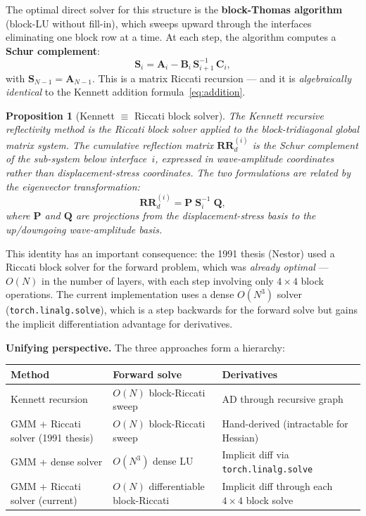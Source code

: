 \documentclass[11pt,a4paper]{article}
\newcommand{\RR}{\mathbf{RR}}
\theoremstyle{plain}
\newtheorem{proposition}{Proposition}
\theoremstyle{remark}
\begin{document}
The optimal direct solver for this structure is the \textbf{block-Thomas
algorithm} (block-LU without fill-in), which sweeps upward through the
interfaces eliminating one block row at a time.  At each step, the
algorithm computes a \textbf{Schur complement}:
\begin{equation}\label{eq:schur}
  \mathbf{S}_i
  = \mathbf{A}_i - \mathbf{B}_i\,\mathbf{S}_{i+1}^{-1}\,\mathbf{C}_i,
\end{equation}
with $\mathbf{S}_{N-1} = \mathbf{A}_{N-1}$.  This is a matrix Riccati
recursion --- and it is \emph{algebraically identical} to the Kennett
addition formula~\eqref{eq:addition}.

\begin{proposition}[Kennett $\equiv$ Riccati block solver]
The Kennett recursive reflectivity method is the Riccati block solver
applied to the block-tridiagonal global matrix system.  The cumulative
reflection matrix $\RR_d^{(i)}$ is the Schur complement of the
sub-system below interface~$i$, expressed in wave-amplitude coordinates
rather than displacement-stress coordinates.  The two formulations are
related by the eigenvector transformation:
\begin{equation}\label{eq:kennett-riccati}
  \RR_d^{(i)}
  = \mathbf{P}\;\mathbf{S}_i^{-1}\;\mathbf{Q},
\end{equation}
where $\mathbf{P}$ and $\mathbf{Q}$ are projections from the
displacement-stress basis to the up/downgoing wave-amplitude basis.
\end{proposition}

This identity has an important consequence: the 1991 thesis (Nestor)
used a Riccati block solver for the forward problem, which was
\emph{already optimal} --- $O(N)$ in the number of layers, with each
step involving only $4\times 4$ block operations.  The current
implementation uses a dense $O(N^3)$ solver
(\texttt{torch.linalg.solve}), which is a step backwards for the forward
solve but gains the implicit differentiation advantage for derivatives.

\medskip\noindent
\textbf{Unifying perspective.}  The three approaches form a hierarchy:

\begin{center}
\renewcommand{\arraystretch}{1.3}
\begin{tabular}{lp{4.2cm}p{4.2cm}}
  \toprule
  \textbf{Method}
    & \textbf{Forward solve}
    & \textbf{Derivatives} \\
  \midrule
  Kennett recursion
    & $O(N)$ block-Riccati sweep
    & AD through recursive graph \\
  GMM + Riccati solver (1991 thesis)
    & $O(N)$ block-Riccati sweep
    & Hand-derived (intractable for Hessian) \\
  GMM + dense solver
    & $O(N^3)$ dense LU
    & Implicit diff via \texttt{torch.linalg.solve} \\
  GMM + Riccati solver (current)
    & $O(N)$ differentiable block-Riccati
    & Implicit diff through each $4\times 4$ block solve \\
  \bottomrule
\end{tabular}
\end{center}
\end{document}
